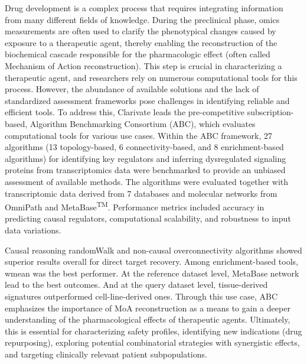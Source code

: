﻿%

%

Drug development is a complex process that requires integrating information from many different fields of knowledge.
During the preclinical phase, omics measurements are often used to clarify the phenotypical changes caused by exposure to a therapeutic agent, thereby enabling the reconstruction of the biochemical cascade responsible for the pharmacologic effect (often called Mechanism of Action reconstruction).
This step is crucial in characterizing a therapeutic agent, and researchers rely on numerous computational tools for this process.
However, the abundance of available solutions and the lack of standardized assessment frameworks pose challenges in identifying reliable and efficient tools.
To address this, Clarivate leads the pre-competitive subscription-based, Algorithm Benchmarking Consortium (ABC), which evaluates computational tools for various use cases.
Within the ABC framework, 27 algorithms (13 topology-based, 6 connectivity-based, and 8 enrichment-based algorithms) for identifying key regulators and inferring dysregulated signaling proteins from transcriptomics data were benchmarked to provide an unbiased assessment of available methods.
The algorithms were evaluated together with transcriptomic data derived from 7 databases and molecular networks from OmniPath and  MetaBase\textsuperscript{TM}.
Performance metrics included accuracy in predicting causal regulators, computational scalability, and robustness to input data variations.

Causal reasoning randomWalk and non-causal overconnectivity algorithms showed superior results overall for direct target recovery. Among enrichment-based tools, wmean was the best performer.
At the reference dataset level, MetaBase network lead to the best outcomes. And at the query dataset level, tissue-derived signatures outperformed cell-line-derived ones.
Through this use case, ABC emphasizes the importance of MoA reconstruction as a means to gain a deeper understanding of the pharmacological effects of therapeutic agents. Ultimately, this is essential for characterizing safety profiles, identifying new indications (drug repurposing), exploring potential combinatorial strategies with synergistic effects, and targeting clinically relevant patient subpopulations.

